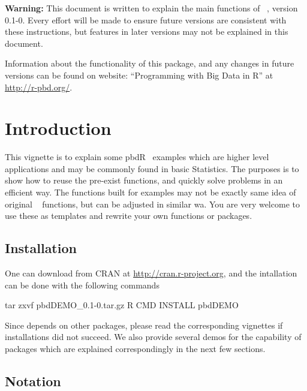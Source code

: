 {\color{red} \bf Warning:} This document is written to explain the main
functions of ~\citep{Schmidt2012pbdDEMOpackage}, version 0.1-0.
Every effort will be made to ensure future versions are consistent with
these instructions, but features in later versions may not be explained
in this document.

Information about the functionality of this package,
and any changes in future versions can be found on website:
``Programming with Big Data in R'' at
\url{http://r-pbd.org/}.


\section[Introduction]{Introduction}
\label{sec:introduction}

This vignette is to explain some pbdR~\citep{pbdR2012}
examples which are higher level
applications and may be commonly found in basic Statistics.
The purposes is to show how to reuse the pre-exist functions, and
quickly solve problems in an efficient way.
The functions built for examples may not be exactly same idea of original
~\citep{Rcore}
functions, but can be adjusted in similar wa.
You are very welcome to use these as templates and rewrite your own functions
or packages.


\subsection[Installation]{Installation}
\label{sec:installation}

One can download  from CRAN at
\url{http://cran.r-project.org}, and
the intallation can be done with the following commands
\begin{Command}
tar zxvf pbdDEMO_0.1-0.tar.gz
R CMD INSTALL pbdDEMO
\end{Command}
Since  depends on other  packages,
please read the corresponding vignettes if installations did
not succeed.
We also provide several demos for the capability of 
packages which are explained correspondingly in the next few sections.


\subsection[Notation]{Notation}
\label{sec:notation}

